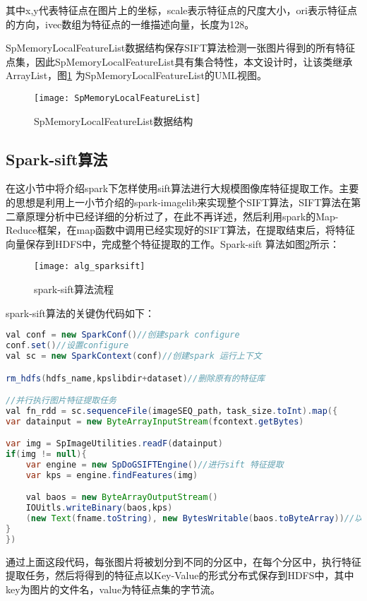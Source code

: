 其中x,y代表特征点在图片上的坐标，scale表示特征点的尺度大小，ori表示特征点的方向，ivec数组为特征点的一维描述向量，长度为128。

SpMemoryLocalFeatureList数据结构保存SIFT算法检测一张图片得到的所有特征点集，因此SpMemoryLocalFeatureList具有集合特性，本文设计时，让该类继承ArrayList，图\ref{fig:spmemflist} 为SpMemoryLocalFeatureList的UML视图。
\begin{figure}[htp]
\centering
\texttt{[image: SpMemoryLocalFeatureList]}
\caption{SpMemoryLocalFeatureList数据结构}
\label{fig:spmemflist}
\end{figure}

\subsection{Spark-sift算法}
在这小节中将介绍spark下怎样使用sift算法进行大规模图像库特征提取工作。主要的思想是利用上一小节介绍的spark-imagelib来实现整个SIFT算法，SIFT算法在第二章原理分析中已经详细的分析过了，在此不再详述，然后利用spark的Map-Reduce框架，在map函数中调用已经实现好的SIFT算法，在提取结束后，将特征向量保存到HDFS中，完成整个特征提取的工作。Spark-sift 算法如图\ref{fig:alg_sparksift}所示：
\begin{figure}[htp]
\centering
\texttt{[image: alg\_sparksift]}
\caption{spark-sift算法流程}
\label{fig:alg_sparksift}
\end{figure}

spark-sift算法的关键伪代码如下：
\begin{lstlisting}[language=Java]
val conf = new SparkConf()//创建spark configure
conf.set()//设置configure
val sc = new SparkContext(conf)//创建spark 运行上下文

rm_hdfs(hdfs_name,kpslibdir+dataset)//删除原有的特征库

//并行执行图片特征提取任务
val fn_rdd = sc.sequenceFile(imageSEQ_path，task_size.toInt).map({
var datainput = new ByteArrayInputStream(fcontext.getBytes)

var img = SpImageUtilities.readF(datainput)
if(img != null){
    var engine = new SpDoGSIFTEngine()//进行sift 特征提取
    var kps = engine.findFeatures(img)

    val baos = new ByteArrayOutputStream()
    IOUitls.writeBinary(baos,kps)
    (new Text(fname.toString), new BytesWritable(baos.toByteArray))//以key-value形式返回提取的特征点，key为图片名，value为特征点集
}
})
\end{lstlisting}

通过上面这段代码，每张图片将被划分到不同的分区中，在每个分区中，执行特征提取任务，然后将得到的特征点以Key-Value的形式分布式保存到HDFS中，其中key为图片的文件名，value为特征点集的字节流。
